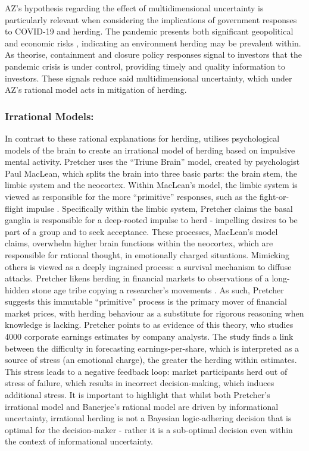 \documentclass[12pt]{article}
\numberwithin{table}{section}   %
\begin{document}
AZ's hypothesis regarding the effect of multidimensional uncertainty is particularly relevant when considering the implications of government responses to COVID-19 and herding. The pandemic presents both significant geopolitical and economic risks \citep{sharif}, indicating an environment herding may be prevalent within. As \citet{kizys} theorise, containment and closure policy responses signal to investors that the pandemic crisis is under control, providing timely and quality information to investors. These signals reduce said multidimensional uncertainty, which under AZ's rational model acts in mitigation of herding.

\subsubsection*{Irrational Models:}

In contrast to these rational explanations for herding, \citet{pretcher} utilises psychological models of the brain to create an irrational model of herding based on impulsive mental activity. Pretcher uses the “Triune Brain” model, created by psychologist Paul MacLean, which splits the brain into three basic parts: the brain stem, the limbic system and the neocortex. Within MacLean’s model, the limbic system is viewed as responsible for the more “primitive” responses, such as the fight-or-flight impulse \citep{MacLean}. Specifically within the limbic system, Pretcher claims the basal ganglia is responsible for a deep-rooted impulse to herd - impelling desires to be part of a group and to seek acceptance. These processes, MacLean’s model claims, overwhelm higher brain functions within the neocortex, which are responsible for rational thought, in emotionally charged situations. Mimicking others is viewed as a deeply ingrained process: a survival mechanism to diffuse attacks. Pretcher likens herding in financial markets to observations of a long-hidden stone age tribe copying a researcher’s movements \citep{gajdusek}. As such, Pretcher suggests this immutable “primitive” process is the primary mover of financial market prices, with herding behaviour as a substitute for rigorous reasoning when knowledge is lacking. Pretcher points to \citet{olsen} as evidence of this theory, who studies 4000 corporate earnings estimates by company analysts. The study finds a link between the difficulty in forecasting earnings-per-share, which is interpreted as a source of stress (an emotional charge), the greater the herding within estimates. This stress leads to a negative feedback loop: market participants herd out of stress of failure, which results in incorrect decision-making, which induces additional stress. It is important to highlight that whilst both Pretcher's irrational model and Banerjee's rational model are driven by informational uncertainty, irrational herding is not a Bayesian logic-adhering decision that is optimal for the decision-maker - rather it is a sub-optimal decision even within the context of informational uncertainty. 
\end{document}

